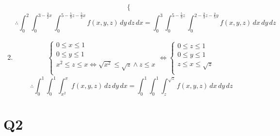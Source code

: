 \documentclass[a4paper, 11pt]{article}
\begin{document}
\begin{enumerate}[label=(\alph*)]
\begin{align*}
\begin{cases}
		      \end{cases}
	      \end{align*}
	      \[
		      \therefore   \int_0^2\int_0^{3-\frac 32x}\int_{0}^{5-\frac53z-\frac 52x}f(x,y,z)\,dy\,dz\,dx    =\int_0^3\int_0^{5-\frac 53z}\int_0^{2-\frac 23z-\frac 25y} f(x,y,z) \,dx\,dy\,dz
	      \]
	\item
	      \begin{align*}
		      \begin{cases}
			      0 \leq x\leq 1                                              \\
			      0 \leq y\leq 1                                              \\
			      x^2 \leq z\leq x\iff \sqrt{x^2} \leq \sqrt z \land z \leq x \\
		      \end{cases}
		      \iff
		      \begin{cases}
			      0 \leq z\leq 1       \\
			      0 \leq y\leq 1       \\
			      z \leq x\leq \sqrt z \\
		      \end{cases}
	      \end{align*}
	      \[
		      \therefore   \int_0^1\int_0^1\int_{x^2}^xf(x,y,z)\,dz\,dy\,dx    =\int_0^1\int_0^1\int_z^{\sqrt z} f(x,y,z) \,dx\,dy\,dz
	      \]

\end{enumerate}
\pagebreak
\section*{Q2}
\end{document}
